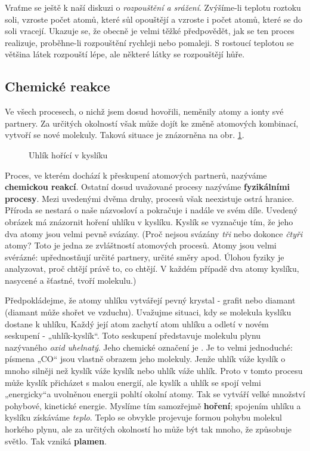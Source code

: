     Vraťme se ještě k naší diskuzi o \emph{rozpouštění a srážení}. Zvýšíme-li teplotu roztoku soli,
    vzroste počet atomů, které sůl opouštějí a vzroste i počet atomů, které se do soli vracejí.
    Ukazuje se, že obecně je velmi těžké předpovědět, jak se ten proces realizuje, proběhne-li
    rozpouštění rychleji nebo pomaleji. S rostoucí teplotou se většina látek rozpouští lépe, ale
    některé látky se rozpouštějí hůře.
    
  \subsection{Chemické reakce}
    Ve všech procesech, o nichž jsem dosud hovořili, neměnily atomy a ionty své partnery. Za
    určitých okolností však může dojít ke změně atomových kombinací, vytvoří se nové molekuly.
    Taková situace je znázorněna na obr. \ref{fyz:fig014}.
    
    \begin{figure}[hbt!]   %
      \centering
      \caption{Uhlík hořící v kyslíku \cite[s.~23]{Feynman01}}
      \label{fyz:fig014}
    \end{figure}

    Proces, ve kterém dochází k přeskupení atomových partnerů, nazýváme \textbf{chemickou reakcí}.
    Ostatní dosud uvažované procesy nazýváme \textbf{fyzikálními procesy}. Mezi uvedenými dvěma
    druhy, procesů však neexistuje ostrá hranice. Příroda se nestará o naše názvosloví a pokračuje i
    nadále ve svém díle. Uvedený obrázek má znázornit hoření uhlíku v kyslíku. Kyslík se vyznačuje
    tím, že jeho dva atomy jsou velmi pevně svázány. (Proč nejsou svázány \emph{tři} nebo dokonce
    \emph{čtyři} atomy? Toto je jedna ze zvláštností atomových procesů. Atomy jsou velmi svérázné:
    upřednostňují určité partnery, určité směry apod. Úlohou fyziky je analyzovat, proč chtějí právě
    to, co chtějí. V každém případě dva atomy kyslíku, nasycené a šťastné, tvoří molekulu.)
    
    Předpokládejme, že atomy uhlíku vytvářejí pevný krystal - grafit nebo diamant (diamant může
    shořet ve vzduchu). Uvažujme situaci, kdy se molekula kyslíku dostane k uhlíku, Každý její atom
    zachytí atom uhlíku a odletí v novém seskupení - „uhlík-kyslík“. Toto seskupení představuje
    molekulu plynu nazývaného \emph{oxid uhelnatý}. Jeho chemické označení je . Je to velmi
    jednoduché: písmena „CO“ jsou vlastně obrazem jeho molekuly. Jenže uhlík váže kyslík o mnoho
    silněji než kyslík váže kyslík nebo uhlík váže uhlík. Proto v tomto procesu může kyslík
    přicházet s malou energií, ale kyslík a uhlík se spojí velmi „energicky“a uvolněnou energii
    pohltí okolní atomy. Tak se vytváří velké množství pohybové, kinetické energie. Myslíme tím
    samozřejmě \textbf{hoření}; spojením uhlíku a kyslíku získáváme \emph{teplo}. Teplo se obvykle
    projevuje formou pohybu molekul horkého plynu, ale za určitých okolností ho může být tak mnoho,
    že způsobuje světlo. Tak vzniká \textbf{plamen}.
    
